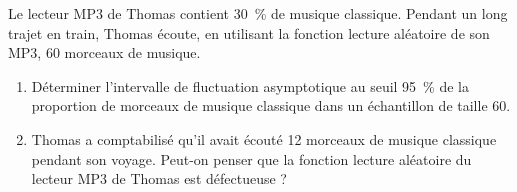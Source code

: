 
Le lecteur MP3 de Thomas contient 30~\% de musique classique. Pendant un long trajet en train, Thomas écoute, en utilisant la fonction \og lecture aléatoire \fg{} de son MP3, 60 morceaux de musique. 

\begin{enumerate}
\item Déterminer l'intervalle de fluctuation asymptotique au seuil 95~\% de la proportion de morceaux de musique classique dans un échantillon de taille 60.
\item Thomas a comptabilisé qu'il avait écouté 12 morceaux de musique classique pendant son voyage. Peut-on penser que la fonction \og lecture aléatoire \fg{} du lecteur MP3 de Thomas est défectueuse ?
\end{enumerate}